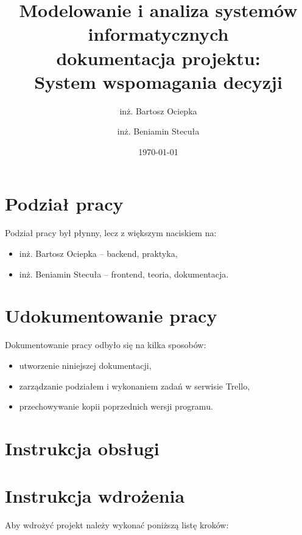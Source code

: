 \documentclass[12pt,a4paper]{article}
\begin{document}
	
	\title{Modelowanie i analiza systemów informatycznych\\
			\bigskip
			\large{dokumentacja projektu:} \\
			\large{System wspomagania decyzji}
		}
	\author{inż. Bartosz Ociepka
		\and inż. Beniamin Stecuła}
	\date{\today}
	
	\maketitle







	\newpage
\section*{Podział pracy}
Podział pracy był płynny, lecz z większym naciskiem na:
\begin{itemize}
	\item inż. Bartosz Ociepka -- backend, praktyka,
	\item inż. Beniamin Stecuła -- frontend, teoria, dokumentacja.
\end{itemize}
	
	
	
\section*{Udokumentowanie pracy}
	Dokumentowanie pracy odbyło się na kilka sposobów:
	\begin{itemize}
		\item utworzenie niniejszej dokumentacji,
		\item zarządzanie podziałem i wykonaniem zadań w serwisie Trello,
		\item przechowywanie kopii poprzednich wersji programu.
	\end{itemize}
	
\section*{Instrukcja obsługi}


	
\section*{Instrukcja wdrożenia}

	Aby wdrożyć projekt należy wykonać poniższą listę kroków:
	
\end{document}
